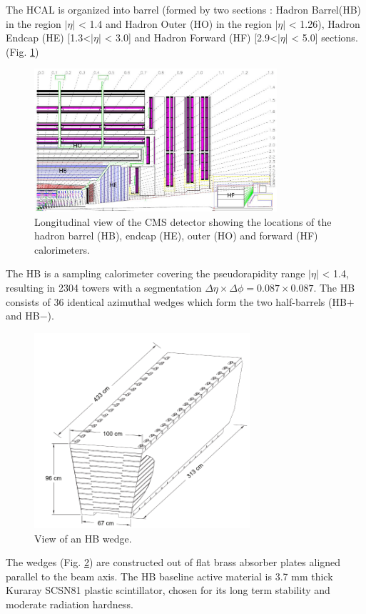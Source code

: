 The HCAL is organized into barrel (formed by two sections : Hadron Barrel(HB) in the region $|\eta|$ < 1.4 and Hadron Outer (HO) in the region $|\eta|$ < 1.26), Hadron Endcap (HE) [1.3<$|\eta|$ < 3.0]  and Hadron Forward (HF) [2.9<$|\eta|$ < 5.0]  sections.(Fig. \ref{fig:hcal1})
\begin{figure}[H]
  \centering
\includegraphics[width=9cm]{CMS_chapter_plots/hcal1}
  \caption{Longitudinal view of the CMS detector showing the locations of the hadron barrel
  (HB), endcap (HE), outer (HO) and forward (HF) calorimeters. \label{fig:hcal1}}
\end{figure}

The HB is a sampling calorimeter covering the pseudorapidity range $|\eta|$ < 1.4, resulting in 2304 towers with a segmentation $\Delta\eta\times\Delta\phi=0.087\times 0.087$.
The HB consists of 36 identical azimuthal wedges which form the two half-barrels (HB$+$ and HB$-$).
\begin{figure}[H]
  \centering
\includegraphics[width=8cm]{CMS_chapter_plots/hcal3}
  \caption{View of an HB wedge. \label{fig:hcal3}}
\end{figure}

The wedges (Fig. \ref{fig:hcal3}) are constructed out of flat brass absorber plates aligned parallel to the beam axis.
The HB baseline active material is 3.7 mm thick Kuraray SCSN81 plastic scintillator, chosen for its long term stability and moderate radiation hardness.

